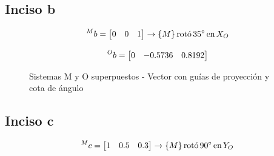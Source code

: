\documentclass[a4paper,12pt]{article}
\begin{document}
\subsection{Inciso b}
\begin{equation*}
    \prescript{M}{}{b} = 
    \begin{bmatrix}
        0 & 0 & 1
    \end{bmatrix}
    \rightarrow \{M\} \, \text{rotó} \,  35^\circ \, \text{en}\, X_O
\end{equation*}

\begin{equation*}
    \prescript{O}{}{b} = 
    \begin{bmatrix}
        0 & -0.5736 & 0.8192
    \end{bmatrix}
\end{equation*}

\begin{figure}[H]
    \centering
    \begin{adjustbox}{scale = 0.85, max width=\columnwidth}
    \end{adjustbox}
    \caption{Sistemas M y O superpuestos - Vector con guías de proyección y cota de ángulo}
\end{figure}

\subsection{Inciso c}
\begin{equation*}
    \prescript{M}{}{c} = 
    \begin{bmatrix}
        1 & 0.5 & 0.3
    \end{bmatrix}
    \rightarrow \{M\} \, \text{rotó} \,  90^\circ \, \text{en}\, Y_O
\end{equation*}
\end{document}
